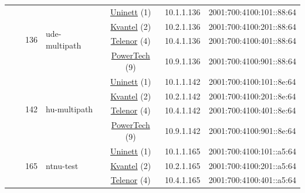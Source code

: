 \begin{small}
\begin{center}
\begin{longtable}{|c|c|c|c|c|c|c|c|}
  &  & \multirow{4}{*}{\tiny{136}} & \multicolumn{1}{|l|}{\multirow{4}{*}{\tiny{ude-multipath}}} & \multicolumn{2}{|c|}{\tiny{\href{https://www.uninett.no}{Uninett} (1)}} & \tiny{10.1.1.136} & \tiny{2001:700:4100:101::88:64} \\* \cline{5-5}\cline{6-6}\cline{7-7}\cline{8-8}
  &  &  &  & \multicolumn{2}{|c|}{\tiny{\href{http://kvantel.no}{Kvantel} (2)}} & \tiny{10.2.1.136} & \tiny{2001:700:4100:201::88:64} \\* \cline{5-5}\cline{6-6}\cline{7-7}\cline{8-8}
  &  &  &  & \multicolumn{2}{|c|}{\tiny{\href{https://www.telenor.no}{Telenor} (4)}} & \tiny{10.4.1.136} & \tiny{2001:700:4100:401::88:64} \\* \cline{5-5}\cline{6-6}\cline{7-7}\cline{8-8}
  &  &  &  & \multicolumn{2}{|c|}{\tiny{\href{http://www.powertech.no}{PowerTech} (9)}} & \tiny{10.9.1.136} & \tiny{2001:700:4100:901::88:64} \\* \cline{3-3}\cline{4-4}\cline{5-5}\cline{6-6}\cline{7-7}\cline{8-8}
  &  & \multirow{4}{*}{\tiny{142}} & \multicolumn{1}{|l|}{\multirow{4}{*}{\tiny{hu-multipath}}} & \multicolumn{2}{|c|}{\tiny{\href{https://www.uninett.no}{Uninett} (1)}} & \tiny{10.1.1.142} & \tiny{2001:700:4100:101::8e:64} \\* \cline{5-5}\cline{6-6}\cline{7-7}\cline{8-8}
  &  &  &  & \multicolumn{2}{|c|}{\tiny{\href{http://kvantel.no}{Kvantel} (2)}} & \tiny{10.2.1.142} & \tiny{2001:700:4100:201::8e:64} \\* \cline{5-5}\cline{6-6}\cline{7-7}\cline{8-8}
  &  &  &  & \multicolumn{2}{|c|}{\tiny{\href{https://www.telenor.no}{Telenor} (4)}} & \tiny{10.4.1.142} & \tiny{2001:700:4100:401::8e:64} \\* \cline{5-5}\cline{6-6}\cline{7-7}\cline{8-8}
  &  &  &  & \multicolumn{2}{|c|}{\tiny{\href{http://www.powertech.no}{PowerTech} (9)}} & \tiny{10.9.1.142} & \tiny{2001:700:4100:901::8e:64} \\* \cline{3-3}\cline{4-4}\cline{5-5}\cline{6-6}\cline{7-7}\cline{8-8}
  &  & \multirow{4}{*}{\tiny{165}} & \multicolumn{1}{|l|}{\multirow{4}{*}{\tiny{ntnu-test}}} & \multicolumn{2}{|c|}{\tiny{\href{https://www.uninett.no}{Uninett} (1)}} & \tiny{10.1.1.165} & \tiny{2001:700:4100:101::a5:64} \\* \cline{5-5}\cline{6-6}\cline{7-7}\cline{8-8}
  &  &  &  & \multicolumn{2}{|c|}{\tiny{\href{http://kvantel.no}{Kvantel} (2)}} & \tiny{10.2.1.165} & \tiny{2001:700:4100:201::a5:64} \\* \cline{5-5}\cline{6-6}\cline{7-7}\cline{8-8}
  &  &  &  & \multicolumn{2}{|c|}{\tiny{\href{https://www.telenor.no}{Telenor} (4)}} & \tiny{10.4.1.165} & \tiny{2001:700:4100:401::a5:64} \\* \cline{5-5}\cline{6-6}\cline{7-7}\cline{8-8}

\end{longtable}
\end{center}
\end{small}
